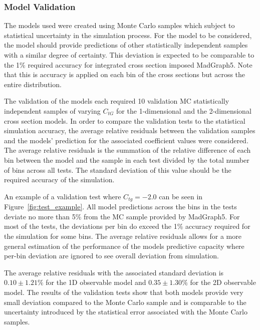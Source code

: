 \documentclass[a4paper,11pt]{article}
\begin{document}
\subsubsection{Model Validation}

The models used were created using Monte Carlo samples which subject to statistical uncertainty in the simulation process.
For the model to be considered, the model should provide predictions of other statistically independent samples with a similar degree of certainty.
This deviation is expected to be comparable to the 1\% required accuracy for integrated cross section imposed MadGraph5.
Note that this is accuracy is applied on each bin of the cross sections but across the entire distribution.

The validation of the models each required 10 validation MC statistically independent samples of varying $C_{tG}$ for the 1-dimensional and the 2-dimensional cross section models.
In order to compare the validation tests to the statistical simulation accuracy, the average relative residuals between the validation samples and the models' prediction for the associated coefficient values were considered.
The average relative residuals is the summation of the relative difference of each bin between the model and the sample in each test divided by the total number of bins across all tests.
The standard deviation of this value should be the required accuracy of the simulation.

An example of a validation test where $C_{tg}=-2.0$ can be seen in Figure~\ref{fig:test_example}.
All model predictions across the bins in the tests deviate no more than 5\% from the MC sample provided by MadGraph5.
For most of the tests, the deviations per bin do exceed the 1\% accuracy required for the simulation for some bins.
The average relative residuals allows for a more general estimation of the performance of the models predictive capacity where per-bin deviation are ignored to see overall deviation from simulation.

The average relative residuals with the associated standard deviation is $0.10\pm1.21\%$ for the 1D observable model and $0.35\pm1.30\%$ for the 2D observable model.
The results of the validation tests show that both models provide very small deviation compared to the Monte Carlo sample and is comparable to the uncertainty introduced by the statistical error associated with the Monte Carlo samples.
\end{document}
